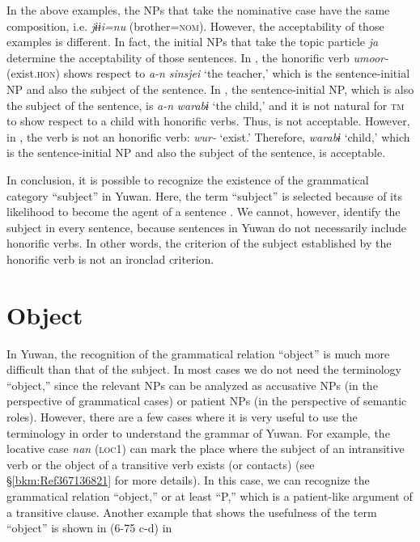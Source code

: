 In the above examples, the NPs that take the nominative case have the same composition, i.e. \textit{jɨɨi=nu} (brother=\textsc{nom}). However, the acceptability of those examples is different. In fact, the initial NPs that take the topic particle \textit{ja} determine the acceptability of those sentences. In , the honorific verb \textit{umoor-} (exist.\textsc{hon}) shows respect to \textit{a-n} \textit{sinsjei} ‘the teacher,’ which is the sentence-initial NP and also the subject of the sentence. In , the sentence-initial NP, which is also the subject of the sentence, is \textit{a-n} \textit{warabɨ} ‘the child,’ and it is not natural for \textsc{tm} to show respect to a child with honorific verbs. Thus,  is not acceptable. However, in , the verb is not an honorific verb: \textit{wur-} ‘exist.’ Therefore, \textit{warabɨ} ‘child,’ which is the sentence-initial NP and also the subject of the sentence, is acceptable.

In conclusion, it is possible to recognize the existence of the grammatical category “subject” in Yuwan. Here, the term “subject” is selected because of its likelihood to become the agent of a sentence \citep[cf.][136]{Andrews2007}. We cannot, however, identify the subject in every sentence, because sentences in Yuwan do not necessarily include honorific verbs. In other words, the criterion of the subject established by the honorific verb is not an ironclad criterion.

\section{Object}
\label{bkm:Ref350115710}\hypertarget{RefHeadingToc395696989}{}

In Yuwan, the recognition of the grammatical relation “object” is much more difficult than that of the subject. In most cases we do not need the terminology “object,” since the relevant NPs can be analyzed as accusative NPs (in the perspective of grammatical cases) or patient NPs (in the perspective of semantic roles). However, there are a few cases where it is very useful to use the terminology in order to understand the grammar of Yuwan. For example, the locative case \textit{nan} (\textsc{loc}1) can mark the place where the subject of an intransitive verb or the object of a transitive verb exists (or contacts) (see §\ref{bkm:Ref367136821} for more details). In this case, we can recognize the grammatical relation “object,” or at least “P,” which is a patient-like argument of a transitive clause. Another example that shows the usefulness of the term “object” is shown in (6-75 c-d) in 
